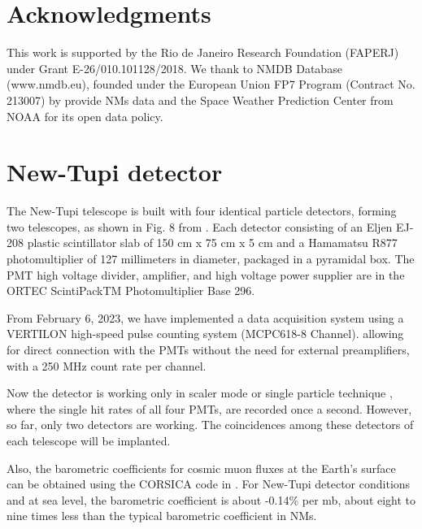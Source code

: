 \documentclass[twocolumn]{aastex63}
\begin{document}
\section{Acknowledgments}

This work is supported by the Rio de Janeiro Research Foundation (FAPERJ) under Grant E-26/010.101128/2018. We thank to NMDB Database (www.nmdb.eu), founded under the European Union FP7 Program (Contract No. 213007)
by provide NMs data and the Space Weather Prediction Center
from NOAA for its open data policy.


\appendix


\section{New-Tupi detector}

The New-Tupi telescope is built with four identical particle detectors, forming two telescopes, as shown in Fig. 8 from \cite{augu16a}. Each detector consisting of an Eljen EJ-208
plastic scintillator slab of 150 cm x 75 cm x 5 cm and a Hamamatsu R877 photomultiplier of 127
millimeters in diameter, packaged in a pyramidal box.
The PMT high voltage divider, amplifier, and high voltage power supplier are in the ORTEC ScintiPackTM Photomultiplier Base 296.

From February 6, 2023, we have implemented a data acquisition system using a VERTILON high-speed pulse counting system (MCPC618-8 Channel). allowing for direct connection with the PMTs without the need for external preamplifiers,
with a 250 MHz count rate per channel.

Now the detector is working only in scaler mode or 
single particle technique \citep{agli96}, where the single hit rates of all four PMTs, are recorded once a second.
 However, so far, only two detectors are working. The coincidences among these detectors of each telescope will be implanted. 
 
Also, the barometric coefficients for cosmic muon fluxes at the Earth's surface can be obtained using the CORSICA code in \cite{kovy13}. For New-Tupi detector conditions and at sea level, the barometric coefficient is about -0.14\% per mb, about eight to nine times less than the typical barometric coefficient in NMs. 



\newpage



\end{document}
